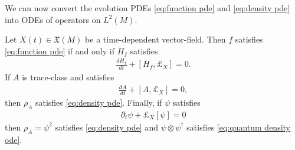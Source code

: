 \documentclass[final,leqno]{siamart}
\begin{document}
We can now convert the evolution PDEs \eqref{eq:function pde} and \eqref{eq:density pde} into ODEs of operators on $L^{2}(M)$.

\begin{theorem} \label{thm:quantize}
	Let $X(t) \in \mathfrak{X}(M)$ be a time-dependent vector-field.
	Then $f$ satisfies \eqref{eq:function pde}
	if and only if $H_{f}$ satisfies
	\begin{align}
		\frac{d H_{f} }{dt} + [ H_{f} , \pounds_{X} ] = 0. \label{eq:quantum observable ode}
	\end{align}
	If $A$ is trace-class and satisfies
	\begin{align}
		\frac{dA}{dt} + [ A , \pounds_{X} ] = 0, \label{eq:quantum density ode}
	\end{align}
	then $\rho_{A}$ satisfies \eqref{eq:density pde}.
	Finally, if $\psi$ satisfies
	\begin{align}
		\partial_t \psi + \pounds_X[\psi] = 0 \label{eq:half density pde}
	\end{align}
	then $\rho_{A} = \psi^{2}$ satisfies \eqref{eq:density pde} and $\psi \otimes \psi^{\dagger}$ satisfies \eqref{eq:quantum density ode}.
\end{theorem}
\end{document}
